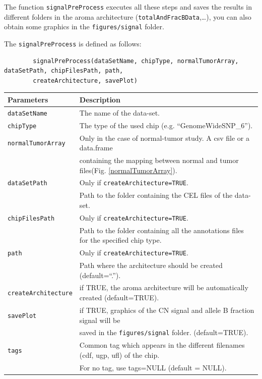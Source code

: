 \documentclass[a4paper,10pt]{article}
\begin{document}
		The function \texttt{signalPreProcess} executes all these steps and saves the results in different folders in the aroma architecture (\texttt{totalAndFracBData},\dots), you can also obtain some graphics in the \texttt{figures/signal} folder.
		
		The \texttt{signalPreProcess} is defined as follows:
		\begin{verbatim}	
		signalPreProcess(dataSetName, chipType, normalTumorArray, dataSetPath, chipFilesPath, path,
		createArchitecture, savePlot)
		\end{verbatim}
	
		\begin{center}
			\begin{tabular}{|l|l|}
				\hline
				Parameters & Description\\
				\hline
				\texttt{dataSetName} & The name of the data-set.\\
				\texttt{chipType} & The type of the used chip (e.g. ``GenomeWideSNP\_6'').\\
				\texttt{normalTumorArray} & Only in the case of normal-tumor study. A csv file or a data.frame\\
				~~ & containing the mapping between normal and tumor files(Fig. \ref{normalTumorArray}).\\
				\texttt{dataSetPath} & Only if \texttt{createArchitecture=TRUE}.\\
				~~ & Path to the folder containing the CEL files of the data-set.\\
				\texttt{chipFilesPath} & Only if \texttt{createArchitecture=TRUE}.\\
				~~ & Path to the folder containing all the annotations files for the specified chip type.\\
				\texttt{path} & Only if \texttt{createArchitecture=TRUE}.\\
				~~ & Path where the architecture should be created (default=``.'').\\
				\texttt{createArchitecture} & if TRUE, the aroma architecture will be automatically created (default=TRUE).\\
				\texttt{savePlot} & if TRUE, graphics of the CN signal and allele B fraction signal will be\\
				~~ & saved in the \texttt{figures/signal} folder. (default=TRUE).\\
        \texttt{tags} & Common tag which appears in the different filenames (cdf, ugp, ufl) of the chip. \\
        ~~ & For no tag, use tags=NULL (default = NULL).\\
				\hline	
			\end{tabular}		
		\end{center}
	
\end{document}

